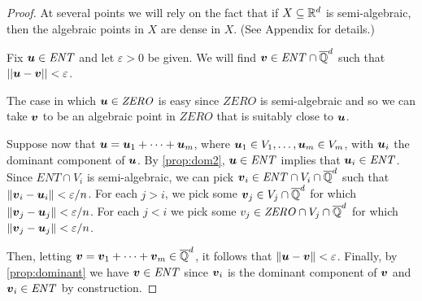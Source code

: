 \begin{proof}
  At several points we will rely on the fact that if
  $X\subseteq\mathbb{R}^d$ is semi-algebraic, then the algebraic
  points in $X$ are dense in $X$.  (See Appendix for details.)

  Fix $\boldsymbol u\in\mathit{ENT}$ and let $\varepsilon>0$ be
  given. We will find $\boldsymbol v\in \mathit{ENT}\cap \overline{\mathbb{Q}}^d$
  such that $||\boldsymbol u-\boldsymbol v||<\varepsilon$.

  The case in which $\boldsymbol u \in \mathit{ZERO}$ is easy since
  $\mathit{ZERO}$ is semi-algebraic and so we can take $\boldsymbol v$
  to be an algebraic point in $\mathit{ZERO}$ that is suitably close
  to $\boldsymbol u$.

  Suppose now that $\boldsymbol u=\boldsymbol u_1+\cdots+\boldsymbol
  u_m$, where $\boldsymbol u_1\in V_1,\ldots,\boldsymbol u_m\in V_m$,
  with $\boldsymbol u_i$ the dominant component of $\boldsymbol u$. By
  \cref{prop:dom2}, $\boldsymbol u\in\mathit{ENT}$ implies
  that $\boldsymbol u_i\in \mathit{ENT}$. Since $\mathit{ENT}\cap V_i$
  is semi-algebraic, we can pick $\boldsymbol v_i\in \mathit{ENT}\cap
  V_i\cap\overline{\mathbb{Q}}^d$ such that $\| \boldsymbol v_i -\boldsymbol u_i
  \|<\varepsilon/n$. For each $j>i$, we pick some $\boldsymbol v_j\in
  V_j\cap \overline{\mathbb{Q}}^d$ for which $\| \boldsymbol v_j - \boldsymbol
  u_j\|<\varepsilon/n$.  For each $j<i$ we pick some $v_j \in
  \mathit{ZERO}\cap V_j\cap \overline{\mathbb{Q}}^d$ for which $\| \boldsymbol
  v_j - \boldsymbol u_j\|<\varepsilon/n$.

  Then, letting $\boldsymbol v=\boldsymbol v_1+\cdots+\boldsymbol v_m
  \in \overline{\mathbb{Q}}^d$, it follows that $\|\boldsymbol u-\boldsymbol
  v\|<\varepsilon$.  Finally, by \cref{prop:dominant} we
  have $\boldsymbol v\in\mathit{ENT}$ since $\boldsymbol v_i$ is the
  dominant component of $\boldsymbol v$ and $\boldsymbol v_i \in
  \mathit{ENT}$ by construction.
\end{proof}
